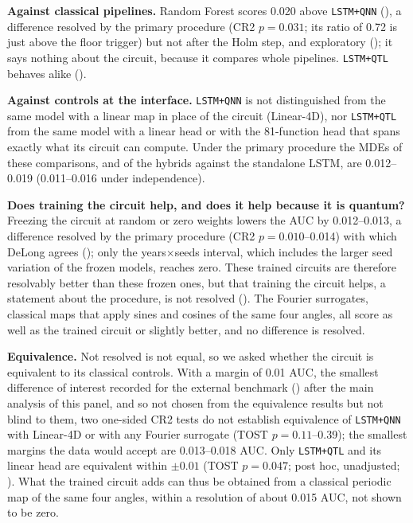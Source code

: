 \documentclass[11pt,a4paper]{article}
\begin{document}
\textbf{Against classical pipelines.} Random Forest scores 0.020 above \texttt{LSTM+QNN} (), a difference resolved by the primary procedure (CR2 $p=0.031$; its ratio of 0.72 is just above the floor trigger) but not after the Holm step, and exploratory (); it says nothing about the circuit, because it compares whole pipelines. \texttt{LSTM+QTL} behaves alike ().

\textbf{Against controls at the interface.} \texttt{LSTM+QNN} is not distinguished from the same model with a linear map in place of the circuit (Linear-4D), nor \texttt{LSTM+QTL} from the same model with a linear head or with the 81-function head that spans exactly what its circuit can compute. Under the primary procedure the MDEs of these comparisons, and of the hybrids against the standalone LSTM, are 0.012--0.019 (0.011--0.016 under independence).

\textbf{Does training the circuit help, and does it help because it is quantum?} Freezing the circuit at random or zero weights lowers the AUC by 0.012--0.013, a difference resolved by the primary procedure (CR2 $p=0.010$--0.014) with which DeLong agrees (); only the years$\times$seeds interval, which includes the larger seed variation of the frozen models, reaches zero. These trained circuits are therefore resolvably better than these frozen ones, but that training the circuit helps, a statement about the procedure, is not resolved (). The Fourier surrogates, classical maps that apply sines and cosines of the same four angles, all score as well as the trained circuit or slightly better, and no difference is resolved.

\textbf{Equivalence.} Not resolved is not equal, so we asked whether the circuit is equivalent to its classical controls. With a margin of 0.01 AUC, the smallest difference of interest recorded for the external benchmark () after the main analysis of this panel, and so not chosen from the equivalence results but not blind to them, two one-sided CR2 tests do not establish equivalence of \texttt{LSTM+QNN} with Linear-4D or with any Fourier surrogate (TOST $p=0.11$--0.39); the smallest margins the data would accept are 0.013--0.018 AUC. Only \texttt{LSTM+QTL} and its linear head are equivalent within $\pm0.01$ (TOST $p=0.047$; post hoc, unadjusted; ). What the trained circuit adds can thus be obtained from a classical periodic map of the same four angles, within a resolution of about 0.015 AUC, not shown to be zero.
\end{document}
